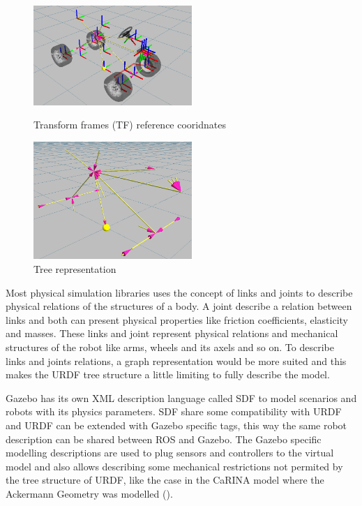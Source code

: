 \begin{figure}[h!]
	\begin{minipage}[b]{0.5\linewidth}
	    \centering
	    \includegraphics[width=6cm]{modelo_carina/carina_tf_side_wheels_transp.png}
	 	\caption{Transform frames (TF) reference cooridnates}
	 	\label{fig:tf}
	\end{minipage}
	\begin{minipage}[b]{0.5\linewidth}
	    \centering
	    \includegraphics[width=6cm]{modelo_carina/carina_tf_side_no_axis.png}
	 	\caption{Tree representation}
	 	\label{fig:tree}
	\end{minipage}	
\end{figure}

Most physical simulation libraries uses the concept of links and joints
to describe physical relations of the structures of a body. A joint describe
a relation between links and both can present physical properties like friction
coefficients, elasticity and masses. These links and joint represent physical
relations and mechanical structures of the robot like arms, wheels and its
axels and so on. To describe links and joints relations, a graph representation
would be more suited and this makes the URDF tree structure a little limiting
to fully describe the model.

Gazebo has its own XML description language called SDF to model scenarios and
robots with its physics parameters. SDF share some compatibility with URDF and
URDF can be extended with Gazebo specific tags, this way the same robot
description can be shared between ROS and Gazebo. The Gazebo specific modelling
descriptions are used to plug sensors and controllers to the virtual model and
also allows describing some mechanical restrictions not permited by the tree
structure of URDF, like the case in the CaRINA model where the Ackermann
Geometry was modelled ().


